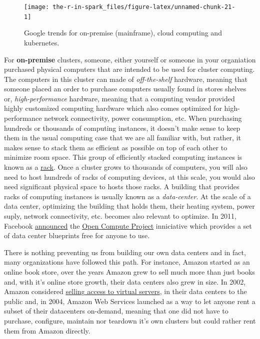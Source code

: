 \documentclass[]{book}
\theoremstyle{definition}
\theoremstyle{definition}
\theoremstyle{definition}
\theoremstyle{remark}
\begin{document}
\begin{figure}

{\centering \texttt{[image: the-r-in-spark\_files/figure-latex/unnamed-chunk-21-1]} 

}

\caption{Google trends for on-premise (mainframe), cloud computing and kubernetes.}\label{fig:unnamed-chunk-21}
\end{figure}

For \textbf{on-premise} clusters, someone, either yourself or someone in
your organiation purchased physical computers that are intended to be
used for cluster computing. The computers in this cluster can made of
\emph{off-the-shelf} hardware, meaning that someone placed an order to
purchase computers usually found in stores shelves or,
\emph{high-performance} hardware, meaning that a computing vendor
provided highly customized computing hardware which also comes optimized
for high-performance network connectivity, power consumption, etc. When
purchasing hundreds or thousands of computing instances, it doesn't make
sense to keep them in the usual computing case that we are all familiar
with, but rather, it makes sense to stack them as efficient as possible
on top of each other to minimize room space. This group of efficiently
stacked computing instances is known as a
\href{https://en.wikipedia.org/wiki/Rack_unit}{rack}. Once a cluster
grows to thousands of computers, you will also need to host hundreds of
racks of computing devices, at this scale, you would also need
significant physical space to hosts those racks. A building that
provides racks of computing instances is usually known as a
\emph{data-center}. At the scale of a data center, optimizing the
building that holds them, their heating system, power suply, network
connectivity, etc. becomes also relevant to optimize. In 2011, Facebook
\href{https://code.facebook.com/posts/187637061409082/building-efficient-data-centers-with-the-open-compute-project/}{announced}
the \href{http://www.opencompute.org/}{Open Compute Project} inniciative
which provides a set of data center blueprints free for anyone to use.

There is nothing preventing us from building our own data centers and in
fact, many organizations have followed this path. For instance, Amazon
started as an online book store, over the years Amazon grew to sell much
more than just books and, with it's online store growth, their data
centers also grew in size. In 2002, Amazon considered
\href{https://en.wikipedia.org/wiki/Amazon_Web_Services\#History}{selling
access to virtual servers}, in their data centers to the public and, in
2004, Amazon Web Services launched as a way to let anyone rent a subset
of their datacenters on-demand, meaning that one did not have to
purchase, configure, maintain nor teardown it's own clusters but could
rather rent them from Amazon directly.
\end{document}
